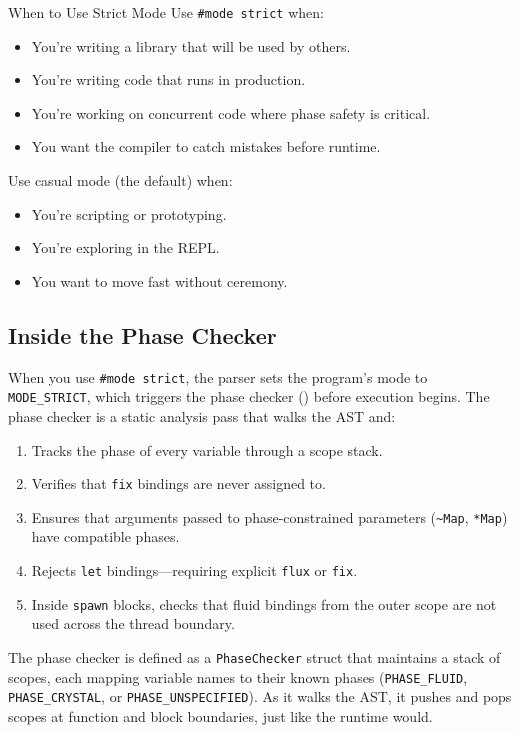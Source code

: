 \begin{tipbox}{When to Use Strict Mode}
Use \lstinline|#mode strict| when:
\begin{itemize}
  \item You're writing a library that will be used by others.
  \item You're writing code that runs in production.
  \item You're working on concurrent code where phase safety is critical.
  \item You want the compiler to catch mistakes before runtime.
\end{itemize}
Use casual mode (the default) when:
\begin{itemize}
  \item You're scripting or prototyping.
  \item You're exploring in the REPL\@.
  \item You want to move fast without ceremony.
\end{itemize}
\end{tipbox}

\subsection{Inside the Phase Checker}\label{subsec:phase-checker-internals}

When you use \lstinline|#mode strict|, the parser sets the program's mode to \lstinline|MODE_STRICT|, which triggers the phase checker () before execution begins.
The phase checker is a static analysis pass that walks the AST and:

\begin{enumerate}
  \item Tracks the phase of every variable through a scope stack.
  \item Verifies that \lstinline|fix| bindings are never assigned to.
  \item Ensures that arguments passed to phase-constrained parameters (\lstinline|~Map|, \lstinline|*Map|) have compatible phases.
  \item Rejects \lstinline|let| bindings---requiring explicit \lstinline|flux| or \lstinline|fix|.
  \item Inside \lstinline|spawn| blocks, checks that fluid bindings from the outer scope are not used across the thread boundary.
\end{enumerate}

The phase checker is defined as a \lstinline|PhaseChecker| struct that maintains a stack of scopes, each mapping variable names to their known phases (\lstinline|PHASE_FLUID|, \lstinline|PHASE_CRYSTAL|, or \lstinline|PHASE_UNSPECIFIED|).
As it walks the AST, it pushes and pops scopes at function and block boundaries, just like the runtime would.

